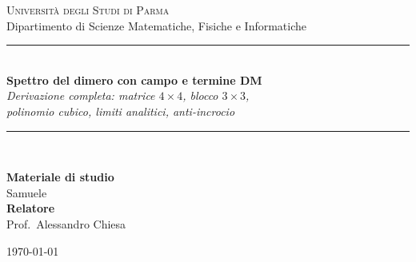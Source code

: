 \documentclass[11pt,a4paper]{article}
\newcommand{\ket}[1]{\lvert #1 \rangle}
\theoremstyle{definition}
\begin{document}
\begin{titlepage}
\centering
\vspace*{2.0cm}
{\Large\scshape Università degli Studi di Parma}\\[0.3cm]
{\large Dipartimento di Scienze Matematiche, Fisiche e Informatiche}\\[2.2cm]
\rule{\linewidth}{0.4pt}\\[0.5cm]
{\LARGE\bfseries Spettro del dimero con campo e termine DM}\\[0.35cm]
{\large\itshape Derivazione completa: matrice $4\times4$, blocco $3\times3$,\\
polinomio cubico, limiti analitici, anti-incrocio}\\[0.4cm]
\rule{\linewidth}{0.4pt}\\[1.6cm]
\begin{flushright}
\begin{minipage}{0.5\linewidth}
\begin{flushleft}
\textbf{Materiale di studio}\\
Samuele\\[0.4cm]
\textbf{Relatore}\\
Prof.\ Alessandro Chiesa
\end{flushleft}
\end{minipage}
\end{flushright}
\vfill
{\small\today}
\end{titlepage}

\tableofcontents
\newpage

\begin{abstract}
\noindent Si studia l'Hamiltoniana del dimero di spin-$\tfrac12$ con interazione di scambio isotropa,
campo magnetico esterno e termine di Dzyaloshinskii--Moriya (DM):
\[
H = J(X_1X_2+Y_1Y_2+Z_1Z_2) + b(Z_1+Z_2) + D\,(X_1Z_2-Z_1X_2).
\]
Ogni passaggio è svolto per esteso: costruzione delle tre matrici $4\times4$ (Passo~1), loro somma
(Passo~2), cambio di base agli stati di spin totale (Passi~3--4), identificazione di un autostato
esatto $\ket{t_0}$ con $E=J$ e riduzione al blocco $3\times3$ (Passo~5), sviluppo completo del
polinomio caratteristico cubico (Passo~6), fattorizzazione nei due limiti $D\to0$ e $b\to0$ con le
rispettive tabelle degli autovalori (Passo~7), e analisi dell'anti-incrocio a $b/J=2$ tramite un
sottoproblema $2\times2$ (Passo~8). Il documento si conclude con la figura dello spettro completo
calcolato numericamente.
\end{abstract}

\end{document}
